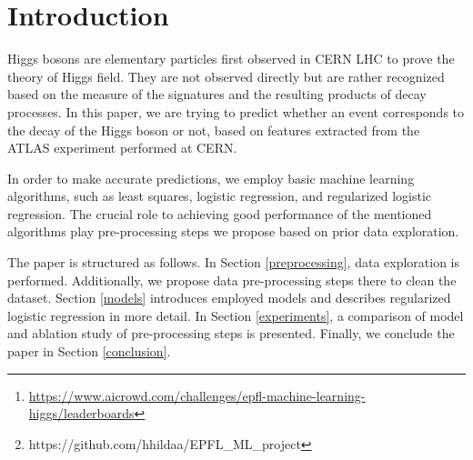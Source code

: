 


\begin{abstract}

Machine learning approaches have become an indispensable part of numerous research fields, providing predictions and explanations of complex multidimensional datasets. In this paper, we focus on developing an approach for detecting whether an event corresponds to the decay of the Higgs boson or not, based on features extracted from the ATLAS experiment performed at CERN. Our best approach uses regularized logistic regression with splitting on the number of jets, feature expansion, median imputing, and outlier bounding. It achieves $0.831\%$ accuracy on the Higgs boson machine learning challenge at AIcrowd platform.\footnote{\hyperlink{AIcrowd}{https://www.aicrowd.com/challenges/epfl-machine-learning-higgs/leaderboards}} The source code of this project is available on GitHub \footnote{https://github.com/hhildaa/EPFL\_ML\_project}.

\end{abstract}


\section{Introduction}

Higgs bosons are elementary particles first observed in CERN LHC to prove the theory of Higgs field. They are not observed directly but are rather recognized based on the measure of the signatures and the resulting products of decay processes. In this paper, we are trying to predict whether an event corresponds to the decay of the Higgs boson or not, based on features extracted from the ATLAS experiment performed at CERN.

In order to make accurate predictions, we employ basic machine learning algorithms, such as least squares, logistic regression, and regularized logistic regression. The crucial role to achieving good performance of the mentioned algorithms play pre-processing steps we propose based on prior data exploration.

The paper is structured as follows. In Section \ref{preprocessing}, data exploration is performed. Additionally, we propose data pre-processing steps there to clean the dataset. Section \ref{models} introduces employed models and describes regularized logistic regression in more detail. In Section \ref{experiments}, a comparison of model and ablation study of pre-processing steps is presented. Finally, we conclude the paper in Section \ref{conclusion}. 








